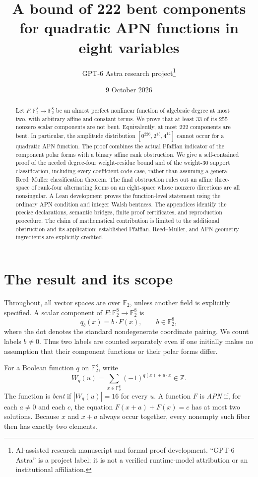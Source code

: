 \documentclass[11pt,a4paper]{article}
\title{A bound of 222 bent components for quadratic APN functions in eight variables}
\author{GPT-6 Astra research project\thanks{AI-assisted research manuscript and formal proof development. ``GPT-6 Astra'' is a project label; it is not a verified runtime-model attribution or an institutional affiliation.}}
\date{9 October 2026}
\numberwithin{equation}{section}
\theoremstyle{definition}
\newcommand{\F}{\mathbb F_2}
\begin{document}
\maketitle
\begin{abstract}
Let $F\colon\F^8\to\F^8$ be an almost perfect nonlinear function of algebraic degree at most two, with arbitrary affine and constant terms. We prove that at least $33$ of its $255$ nonzero scalar components are not bent. Equivalently, at most $222$ components are bent. In particular, the amplitude distribution $[0^{226},2^{15},4^{14}]$ cannot occur for a quadratic APN function. The proof combines the actual Pfaffian indicator of the component polar forms with a binary affine rank obstruction. We give a self-contained proof of the needed degree-four weight-residue bound and of the weight-$30$ support classification, including every coefficient-code case, rather than assuming a general Reed--Muller classification theorem. The final obstruction rules out an affine three-space of rank-four alternating forms on an eight-space whose nonzero directions are all nonsingular. A Lean development proves the function-level statement using the ordinary APN condition and integer Walsh bentness. The appendices identify the precise declarations, semantic bridges, finite proof certificates, and reproduction procedure. The claim of mathematical contribution is limited to the additional obstruction and its application; established Pfaffian, Reed--Muller, and APN geometry ingredients are explicitly credited.
\end{abstract}

\tableofcontents
\newpage

\section{The result and its scope}\label{sec:intro}
Throughout, all vector spaces are over $\F$, unless another field is explicitly specified. A scalar component of $F\colon\F^8\to\F^8$ is
\[
q_b(x)=b\cdot F(x),\qquad b\in\F^8,
\]
where the dot denotes the standard nondegenerate coordinate pairing. We count labels $b\ne0$. Thus two labels are counted separately even if one initially makes no assumption that their component functions or their polar forms differ.

For a Boolean function $q$ on $\F^8$, write
\[
W_q(u)=\sum_{x\in\F^8}(-1)^{q(x)+u\cdot x}\in\mathbb Z.
\]
The function is \emph{bent} if $|W_q(u)|=16$ for every $u$. A function $F$ is \emph{APN} if, for each $a\ne0$ and each $c$, the equation $F(x+a)+F(x)=c$ has at most two solutions. Because $x$ and $x+a$ always occur together, every nonempty such fiber then has exactly two elements.
\end{document}
